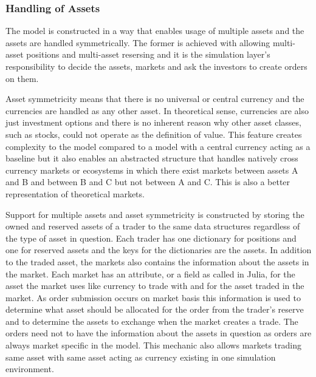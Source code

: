 

\subsubsection{Handling of Assets}

The model is constructed in a way that enables usage of multiple assets
and the assets are handled symmetrically. The former is achieved with
allowing multi-asset positions and multi-asset resersing and 
it is the simulation layer's responsibility to decide the assets, 
markets and ask the investors to create orders on them. 

Asset symmetricity means that there is no universal or central currency 
and the currencies are handled as any other asset. In theoretical sense, 
currencies are also just investment options and there is no inherent reason why other 
asset classes, such as stocks, could not operate as the definition 
of value. This feature creates complexity to the model compared to a model
with a central currency acting as a baseline but it also enables an
abstracted structure that handles natively cross currency
markets or ecosystems in which there exist markets between assets A and 
B and between B and C but not between A and C. This is also a better 
representation of theoretical markets.

Support for multiple assets and asset symmetricity is constructed by storing 
the owned and reserved assets of a trader to the same data structures regardless
of the type of asset in question. Each trader has one dictionary for positions
and one for reserved assets and the keys for the dictionaries are the assets.
In addition to the traded asset, the markets also contains the information 
about the assets in the market. Each market has an attribute, or a field as called
in Julia, for the asset the market uses like currency to trade with and for the asset
traded in the market. As order submission occurs on market basis this information
is used to determine what asset should be allocated for the order from the trader's
reserve and to determine the assets to exchange when the market creates a trade. 
The orders need not to have the information about the assets in question as orders are always
market specific in the model. This mechanic also allows markets trading same asset with same 
asset acting as currency existing in one simulation environment. 

